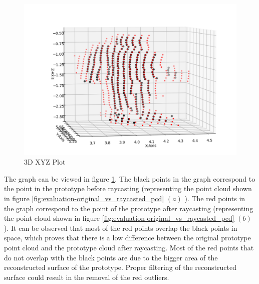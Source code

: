 \begin{figure}[htbp]
    \centering
    \includegraphics[width=1\linewidth]{97_graphics/evaluation/3dxyz_plot.pdf}
    \caption{3D XYZ Plot}
    \label{fig:evaluation_3dplot}
\end{figure}

The graph can be viewed in figure \ref{fig:evaluation_3dplot}. The black points in the graph correspond to the point in the prototype before raycasting (representing the point cloud shown in figure \ref{fig:evaluation-original_vs_raycasted_pcd} \((a)\) ). The red points in the graph correspond to the point of the prototype after raycasting (representing the point cloud shown in figure \ref{fig:evaluation-original_vs_raycasted_pcd} \((b)\) ). It can be observed that most of the red points overlap the black points in space, which proves that there is a low difference between the original prototype point cloud and the prototype cloud after raycasting. Most of the red points that do not overlap with the black points are due to the bigger area of the reconstructed surface of the prototype. Proper filtering of the reconstructed surface could result in the removal of the red outliers.

